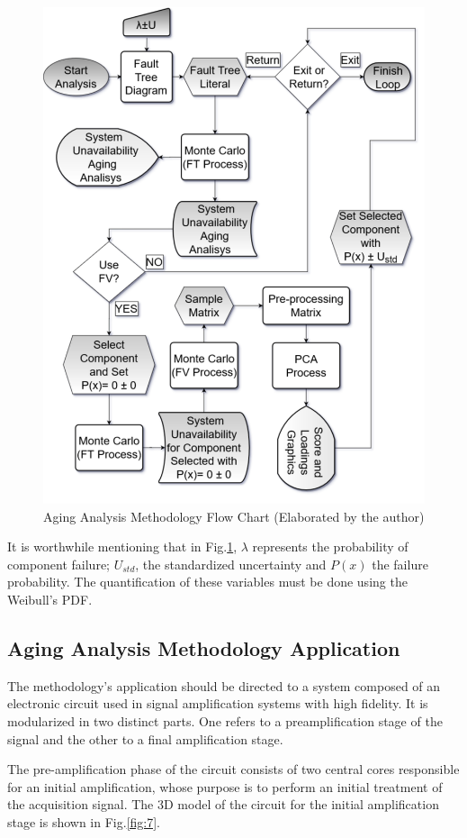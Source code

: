 \documentclass{ws-m3as}
\begin{document}
\begin{figure} [H] 
	\centering 
	\includegraphics[width=0.8\linewidth]{Figures/Fluxograma}
	\caption{Aging Analysis Methodology Flow Chart (Elaborated by the author)}
	\label{fig:6}
\end{figure}

It is worthwhile mentioning that in Fig.\ref{fig:6}, $\lambda$ represents the probability of component failure; $U_{std}$, the standardized uncertainty and $P(x)$ the failure probability. The quantification of these variables must be done using the Weibull's PDF.

\subsection{Aging Analysis Methodology Application}

The methodology's application should be directed to a system composed of an electronic circuit used in signal amplification systems with high fidelity. It is modularized in two distinct parts. One refers to a preamplification stage of the signal and the other to a final amplification stage.

The pre-amplification phase of the circuit consists of two central cores responsible for an initial amplification, whose purpose is to perform an initial treatment of the acquisition signal. The 3D model of the circuit for the initial amplification stage is shown in Fig.\ref{fig:7}.
\end{document}
